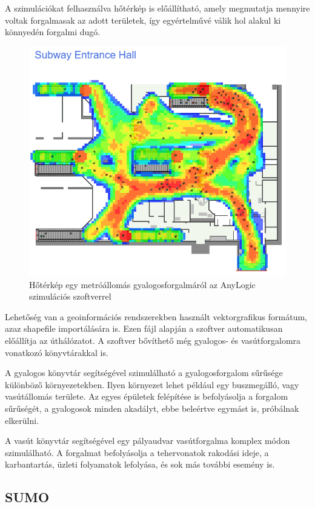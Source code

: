 A szimulációkat felhasználva hőtérkép is előállítható, amely megmutatja mennyire voltak
forgalmasak az adott területek, így egyértelművé válik hol alakul ki könnyedén forgalmi dugó.
\begin{figure}[H]
\includegraphics[width=\linewidth]{heatmap.png}
\caption{Hőtérkép egy metróállomás gyalogosforgalmáról az AnyLogic szimulációs szoftverrel\cite{heatmappic}}
\label{fig:heatmp}
\end{figure}

Lehetőség van a geoinformációs rendszerekben használt vektorgrafikus formátum, azaz shapefile importálására is. Ezen fájl alapján a szoftver automatikusan
előállítja az úthálózatot. A szoftver bővíthető még gyalogos- és vasútforgalomra vonatkozó könyvtárakkal is.

A gyalogos könyvtár segítségével szimulálható a gyalogosforgalom sűrűsége különböző környezetekben. Ilyen környezet lehet például egy buszmegálló, vagy vasútállomás területe. Az egyes épületek
felépítése is befolyásolja a forgalom sűrűségét, a gyalogosok minden akadályt, ebbe beleértve egymást is, próbálnak elkerülni.

A vasút könyvtár segítségével egy pályaudvar vasútforgalma komplex módon szimulálható. A forgalmat befolyásolja a tehervonatok rakodási ideje, a karbantartás, üzleti folyamatok lefolyása, és sok
más további esemény is.
\subsection{SUMO}

